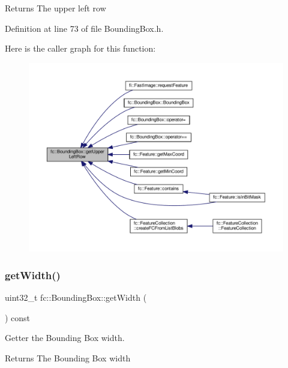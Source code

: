 \begin{DoxyReturn}{Returns}
The upper left row 
\end{DoxyReturn}


Definition at line 73 of file Bounding\+Box.\+h.

Here is the caller graph for this function\+:
\nopagebreak
\begin{figure}[H]
\begin{center}
\leavevmode
\includegraphics[width=350pt]{db/dc1/classfc_1_1BoundingBox_a921418d145cc148a50d599b51447215a_icgraph}
\end{center}
\end{figure}
\mbox{\label{classfc_1_1BoundingBox_aecdcbec558ef3396ed42924d4937d981}} 
\subsubsection{\texorpdfstring{get\+Width()}{getWidth()}}
{\footnotesize\ttfamily uint32\+\_\+t fc\+::\+Bounding\+Box\+::get\+Width (\begin{DoxyParamCaption}{ }\end{DoxyParamCaption}) const\hspace{0.3cm}{\ttfamily [inline]}}



Getter the Bounding Box width. 

\begin{DoxyReturn}{Returns}
The Bounding Box width 
\end{DoxyReturn}


